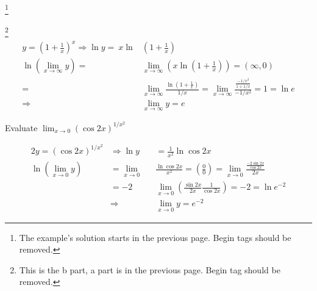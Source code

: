 \documentclass[11pt]{amsbook}
\begin{document}



\begin{exmp} \footnote{The example's solution starts in the previous page. 
			        Begin tags should be removed.}

	\begin{hSolution}
		\begin{hEnumerateAlpha} 
			\item \footnote{This is the b part, a part is in the previous page. 
					     Begin tag should be removed.}
   			\begin{align*}
					y = 
						(1 + \frac{1}{x})^x 
						\Rightarrow 
						\ln y =\:x\ln&(1 + \frac{1}{x})\\
	  		\ln (\lim_{x\to\infty} y) = 
							         &\lim_{x\to\infty} 
											\left( x\ln(1 +
													\frac
														{1}
														{x}
									      			      )\right) = 
														(\infty,0)\\
				   	       	                = &\lim_{x\to\infty} 
										\frac
											{\ln(1+\frac{1}{x})}
											{1/x} 
														= \lim_{x\to\infty}
																	\frac
																		{\frac
																			{-1/x^2}
																			{1 + 1/x}
																		}
																		{-1/x^2} 
																						= 1 = \ln e\\
		   	 		           \Rightarrow &\lim_{x\to\infty} y = e
			\end{align*}
		\end{hEnumerateAlpha}
	\end{hSolution}

\end{exmp}


\begin{exmp}

	Evaluate $\lim_{x\to 0} (\cos 2x)^{1/x^2}$

	\begin{hSolution}
		\begin{alignat*}{2}
			y = (\cos 2x)^{1/x^2} 
				&\Rightarrow \ln y &&= \frac{1}{x^2}
										\ln \cos 2x\\
	 \ln(\lim_{x\to 0} y) &= \lim_{x\to 0}    &&\frac
								{\ln \cos 2x}
								{x^2} 
										= \left( \frac{0}{0} \right) 
														= \lim_{x\to 0} 
																\frac
																	{\frac
																		{-2 \sin 2x}
																		{\cos 2x}
																	}
																	{2x} \\
				&= -2                     &&\lim_{x\to 0} 
									(\frac
										{\sin 2x}
										{2x} 
									 \frac
										{1}
										{\cos 2x}
									) = -2 = \ln e^{-2}\\
				&\Rightarrow         &&\lim_{x\to 0} y = e^{-2}
		\end{alignat*}
	\end{hSolution}

\end{exmp}
\end{document}
